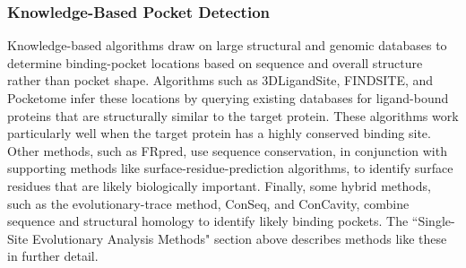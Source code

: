 \subsubsection{Knowledge-Based Pocket Detection}
\par Knowledge-based algorithms draw on large structural and genomic databases to determine binding-pocket locations based on sequence and overall structure rather than pocket shape. Algorithms such as 3DLigandSite,\cite{Wass2010a} FINDSITE,\cite{Brylinski2008a} and Pocketome\cite{Kufareva2012} infer these locations by querying existing databases for ligand-bound proteins that are structurally similar to the target protein. These algorithms work particularly well when the target protein has a highly conserved binding site. Other methods, such as FRpred, use sequence conservation, in conjunction with supporting methods like surface-residue-prediction algorithms, to identify surface residues that are likely biologically important.\cite{Fischer2008a} Finally, some hybrid methods, such as the evolutionary-trace method,\cite{Lichtarge2002a} ConSeq,\cite{Berezin2004a} and ConCavity,\cite{Capra2009a} combine sequence and structural homology to identify likely binding pockets. The ``Single-Site Evolutionary Analysis Methods" section above describes methods like these in further detail.
